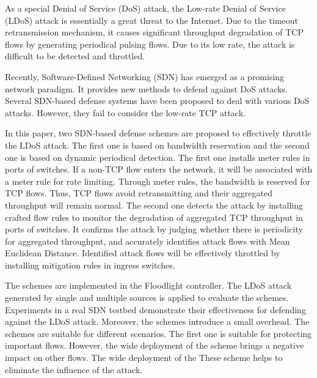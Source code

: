 \begin{eabstract}
  As a special Denial of Service (DoS) attack, the Low-rate Denial of Service (LDoS) attack is essentially a great threat to the Internet. Due to the timeout retransmission mechanism, it causes significant throughput degradation of TCP flows by generating periodical pulsing flows. Due to its low rate, the attack is difficult to be detected and throttled.

  Recently, Software-Defined Networking (SDN) has emerged as a promising network paradigm. It provides new methods to defend against DoS attacks. Several SDN-based defense systems have been proposed to deal with various DoS attacks. However, they fail to consider the low-rate TCP attack.

  In this paper, two SDN-based defense schemes are proposed to effectively throttle the LDoS attack. The first one is based on bandwidth reservation and the second one is based on dynamic periodical detection. The first one installs meter rules in ports of switches. If a non-TCP flow enters the network, it will be associated with a meter rule for rate limiting. Through meter rules, the bandwidth is reserved for TCP flows. Thus, TCP flows avoid retransmitting and their aggregated throughput will remain normal. The second one detects the attack by installing crafted flow rules to monitor the degradation of aggregated TCP throughput in ports of switches. It confirms the attack by judging whether there is periodicity for aggregated throughput, and accurately identifies attack flows with Mean Euclidean Distance. Identified attack flows will be effectively throttled by installing mitigation rules in ingress switches.

  The schemes are implemented in the Floodlight controller. The LDoS attack generated by single and multiple sources is applied to evaluate the schemes. Experiments in a real SDN testbed demonstrate their effectiveness for defending against the LDoS attack. Moreover, the schemes introduce a small overhead. The schemes are suitable for different scenarios. The first one is suitable for protecting important flows. However, the wide deployment of the scheme brings a negative impact on other flows. The wide deployment of the These scheme helps to eliminate the influence of the attack.

\end{eabstract}

